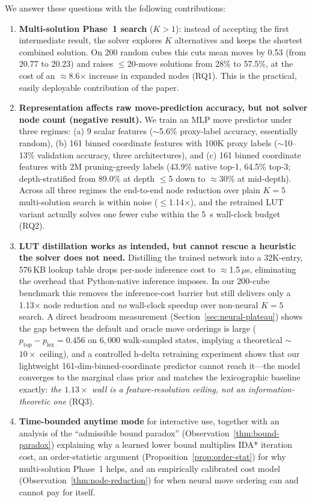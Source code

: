 \documentclass[graybox]{svmult}
\begin{document}
\noindent We answer these questions with the following contributions:
\begin{enumerate}[leftmargin=*]
  \item \textbf{Multi-solution Phase~1 search} ($K > 1$): instead of accepting the first intermediate result, the solver explores $K$ alternatives and keeps the shortest combined solution. On 200 random cubes this cuts mean moves by 0.53 (from 20.77 to 20.23) and raises $\leq$20-move solutions from 28\% to 57.5\%, at the cost of an $\approx$8.6$\times$ increase in expanded nodes (RQ1). This is the practical, easily deployable contribution of the paper.
  \item \textbf{Representation affects raw move-prediction accuracy, but not solver node count (negative result).} We train an MLP move predictor under three regimes: (a) 9 scalar features ($\sim$5.6\% proxy-label accuracy, essentially random), (b) 161 binned coordinate features with 100K proxy labels ($\sim$10--13\% validation accuracy, three architectures), and (c) 161 binned coordinate features with 2M pruning-greedy labels (43.9\% native top-1, 64.5\% top-3; depth-stratified from 89.0\% at depth $\leq$5 down to $\approx$30\% at mid-depth). Across all three regimes the end-to-end node reduction over plain $K{=}5$ multi-solution search is within noise ($\leq$1.14$\times$), and the retrained LUT variant actually solves one fewer cube within the 5~s wall-clock budget (RQ2).
  \item \textbf{LUT distillation works as intended, but cannot rescue a heuristic the solver does not need.} Distilling the trained network into a 32K-entry, 576\,KB lookup table drops per-node inference cost to $\approx$1.5\,$\mu$s, eliminating the overhead that Python-native inference imposes. In our 200-cube benchmark this removes the inference-cost barrier but still delivers only a 1.13$\times$ node reduction and \emph{no} wall-clock speedup over non-neural $K{=}5$ search. A direct headroom measurement (Section~\ref{sec:neural-plateau}) shows the gap between the default and oracle move orderings is large ($p_{\text{top}} - p_{\text{lex}} = 0.456$ on $6{,}000$ walk-sampled states, implying a theoretical $\sim$$10\times$ ceiling), and a controlled h-delta retraining experiment shows that our lightweight 161-dim-binned-coordinate predictor cannot reach it---the model converges to the marginal class prior and matches the lexicographic baseline exactly: \emph{the $1.13\times$ wall is a feature-resolution ceiling, not an information-theoretic one} (RQ3).
  \item \textbf{Time-bounded anytime mode} for interactive use, together with an analysis of the ``admissible bound paradox'' (Observation~\ref{thm:bound-paradox}) explaining why a learned lower bound multiplies IDA* iteration cost, an order-statistic argument (Proposition~\ref{prop:order-stat}) for why multi-solution Phase~1 helps, and an empirically calibrated cost model (Observation~\ref{thm:node-reduction}) for when neural move ordering can and cannot pay for itself.
\end{enumerate}
\end{document}
